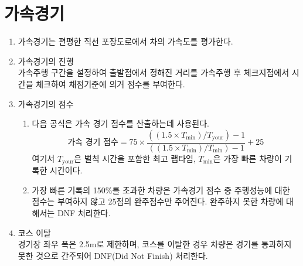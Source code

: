 \documentclass[final,a4paper,10pt]{report}
\begin{document}
\section{가속경기}\label{rule:formula-competition.acceleration}
\begin{enumerate}
  \item\label{rule:formula-competition.acceleration.flat-straight-course} 가속경기는 편평한 직선 포장도로에서 차의 가속도를 평가한다.
  \item\label{rule:formula-competition.acceleration.timed-run-to-checkpoint} 가속경기의 진행\\
    가속주행 구간을 설정하여 출발점에서 정해진 거리를 가속주행 후 체크지점에서 시간을 체크하여 채점기준에 의거 점수를 부여한다.
  \item\label{rule:formula-competition.acceleration.scoring-formula} 가속경기의 점수
    \begin{enumerate}
      \item\label{rule:formula-competition.acceleration.scoring-formula.score-equation} 다음 공식은 가속 경기 점수를 산출하는데 사용된다.
        \[
          \text{가속 경기 점수} = 75 \times
          \frac{((1.5 \times T_{\min}) / T_{\mathrm{your}}) - 1}
               {((1.5 \times T_{\min}) / T_{\min}) - 1} + 25
        \]
        여기서 $T_{\mathrm{your}}$은 벌칙 시간을 포함한 최고 랩타임, $T_{\min}$은 가장 빠른 차량이 기록한 시간이다.
      \item\label{rule:formula-competition.acceleration.scoring-formula.over-150pct-finish-only} 가장 빠른 기록의 150\%를 초과한 차량은 가속경기 점수 중 주행성능에 대한 점수는 부여하지 않고 25점의 완주점수만 주어진다. 완주하지 못한 차량에 대해서는 DNF 처리한다.
    \end{enumerate}
  \item\label{rule:formula-competition.acceleration.course-width-and-dnf} 코스 이탈\\
    경기장 좌우 폭은 2.5m로 제한하며, 코스를 이탈한 경우 차량은 경기를 통과하지 못한 것으로 간주되어 DNF(Did Not Finish) 처리한다.
\end{enumerate}

\end{document}
